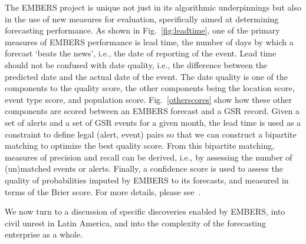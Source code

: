 The EMBERS project is unique not just in its algorithmic underpinnings but also in the use of new measures
for evaluation, specifically aimed at determining forecasting performance. As shown in Fig.~\ref{fig:leadtime},
one of the primary measures of EMBERS performance is lead time, the number of days by which a forecast
`beats the news', i.e., the date of reporting of the event. Lead time should not be confused with
date quality, i.e., the difference between the predicted date and the actual date of the event. The date
quality is one of the components to the quality score, the other components being the
location score, event type score, and population score. Fig.~\ref{otherscores} show how these other
components are scored between an EMBERS forecast and a GSR record. Given a set of alerts and a set of
GSR events for a given month, the lead time is used as a constraint to define legal (alert, event) pairs so that
we can construct a bipartite matching to optimize the best quality score. From this bipartite matching,
measures of precision and recall can be derived, i.e., by assessing the number of (un)matched events or
alerts. Finally, a confidence score is used to assess the quality of probabilities imputed by EMBERS to its
forecasts, and measured in terms of the Brier score. For more details, please
see~\cite{kdd:beating-the-news}.

We now turn to a discussion of specific discoveries enabled by EMBERS, into civil unrest in Latin America, and into
the complexity of the forecasting enterprise as a whole.

